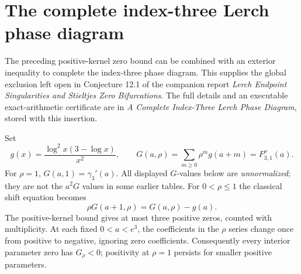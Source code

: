 \section{The complete index-three Lerch phase diagram}
\label{globalphase:section}
The preceding positive-kernel zero bound can be combined with an exterior
inequality to complete the index-three phase diagram. This supplies the
global exclusion left open in Conjecture 12.1 of the companion report
\emph{Lerch Endpoint Singularities and Stieltjes Zero Bifurcations}.
The full details and an executable exact-arithmetic certificate are in
\emph{A Complete Index-Three Lerch Phase Diagram}, stored with this insertion.

Set
\[
 g(x)=\frac{\log^2x(3-\log x)}{x^2},\qquad
 G(a,\rho)=\sum_{m\geq0}\rho^m g(a+m)=F_{3,1}^{\rho}(a).
\]
For $\rho=1$, $G(a,1)=\gamma_3'(a)$. All displayed $G$-values below are
\emph{unnormalized}; they are not the $a^2G$ values in some earlier tables.
For $0<\rho\leq1$ the classical shift equation becomes
\begin{equation}\label{globalphase:shift}
 \rho G(a+1,\rho)=G(a,\rho)-g(a).
\end{equation}
The positive-kernel bound gives at most three positive zeros, counted with
multiplicity. At each fixed $0<a<e^3$, the coefficients in the $\rho$ series
change once from positive to negative, ignoring zero coefficients.
Consequently every interior parameter zero has $G_\rho<0$; positivity at
$\rho=1$ persists for smaller positive parameters.

